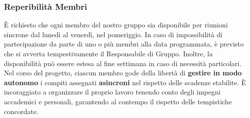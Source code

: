 \documentclass[5pt]{article}
\begin{document}
\subsubsection{Reperibilità Membri}
È richiesto che ogni membro del nostro gruppo sia disponibile per riunioni sincrone dal lunedì al venerdì, nel pomeriggio. In caso di impossibilità di partecipazione da parte di uno o più membri alla data programmata, è previsto che si avverta tempestivamente il Responsabile di Gruppo. Inoltre, la disponibilità può essere estesa al fine settimana in caso di necessità particolari.\\
Nel corso del progetto, ciascun membro gode della libertà di \textbf{gestire in modo autonomo} i compiti assegnati \textbf{asincroni} nel rispetto delle scadenze stabilite. È incoraggiato a organizzare il proprio lavoro tenendo conto degli impegni accademici e personali, garantendo al contempo il rispetto delle tempistiche concordate.\\
\end{document}
